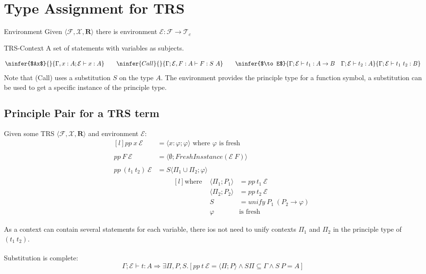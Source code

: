 \section{Type Assignment for TRS}
\begin{tcbraster}[raster columns=2,raster equal height]
	\begin{definitionbox}{Environment}
		Given $\langle \mathcal{F}, \mathcal{X}, \mathbf{R} \rangle$ there is environment $\mathcal{E} : \mathcal{F} \to \mathcal{T}_c$
	\end{definitionbox}
	\begin{definitionbox}{TRS-Context}
		A set of statements with variables as subjects.
	\end{definitionbox}
\end{tcbraster}
\[\ninfer{$Ax$}{}{\Gamma, x:A ; \mathcal{E} \vdash x : A} \qquad \ninfer{Call}{}{\Gamma; \mathcal{E}, F:A \vdash F : S \ A} \qquad \ninfer{$\to E$}{\Gamma;\mathcal{E} \vdash t_1 : A \to B \quad \Gamma;\mathcal{E} \vdash t_2 : A}{\Gamma ; \mathcal{E} \vdash t_1 \ t_2 : B}\]
Note that (Call) uses a substitution $S$ on the type $A$. The environment provides the principle type for a function symbol, a substitution can be used to get a specific instance of the principle type.

\subsection{Principle Pair for a TRS term}
Given some TRS $\langle \mathcal{F}, \mathcal{X}, \mathbf{R} \rangle$ and environment $\mathcal{E}$:
\[\begin{matrix*}[l]
		pp \ x \ \mathcal{E} & = \langle x:\varphi; \varphi \rangle \text{ where } \varphi \text{ is fresh} \\
		\\
		pp \ F \ \mathcal{E} & = \langle \emptyset; FreshInsstance (\mathcal{E} \ F) \rangle \\
		\\
		pp \ (t_1 \ t_2) \ \mathcal{E} & = S \langle \Pi_1 \cup \Pi_2 ; \varphi \rangle \\
		& \qquad \begin{matrix*}[l]
			\text{where } & \langle \Pi_1 ; P_1 \rangle & = pp \ t_1 \ \mathcal{E} \\
			& \langle \Pi_2 ; P_2 \rangle & = pp \ t_2 \ \mathcal{E} \\
			& S & = unify \ P_1 \ (P_2 \to \varphi) \\
			& \varphi & \text{is fresh} \\
		\end{matrix*} \\
	\end{matrix*}\]
As a context can contain several statements for each variable, there ios not need to unify contexts $\Pi_1$ and $\Pi_2$ in the principle type of $(t_1 \ t_2)$.
\\
\\ Substitution is complete:
\[\Gamma ; \mathcal{E} \vdash t : A \Rightarrow \exists \Pi, P, S . [pp \ t \ \mathcal{E} = \langle \Pi ; P \rangle \land S \Pi \subseteq \Gamma \land S \ P = A]\]

